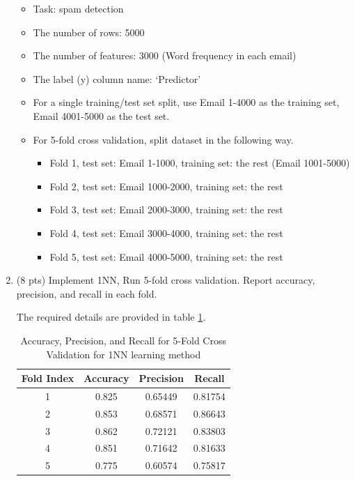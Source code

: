 \documentclass[a4paper]{article}
\theoremstyle{definition}
\newenvironment{soln}{
    \leavevmode\color{blue}\ignorespaces
}{}
\begin{document}
\begin{enumerate}
	\begin{itemize}
		\item Task: spam detection
		\item The number of rows: 5000
		\item The number of features: 3000 (Word frequency in each email)
		\item The label (y) column name: `Predictor'
		\item For a single training/test set split, use Email 1-4000 as the training set, Email 4001-5000 as the test set.
		\item For 5-fold cross validation, split dataset in the following way.
		\begin{itemize}
			\item Fold 1, test set: Email 1-1000, training set: the rest (Email 1001-5000)
			\item Fold 2, test set: Email 1000-2000, training set: the rest
			\item Fold 3, test set: Email 2000-3000, training set: the rest
			\item Fold 4, test set: Email 3000-4000, training set: the rest
			\item Fold 5, test set: Email 4000-5000, training set: the rest			
		\end{itemize}
	\end{itemize}
	
	\item (8 pts) Implement 1NN, Run 5-fold cross validation. Report accuracy, precision, and recall in each fold.
	
	\begin{soln}
    The required details are provided in table \ref{tab:1}.
    \begin{table}[H]
        \centering
        \begin{tabular}{|c|c|c|c|}
            \hline
            Fold Index & Accuracy & Precision & Recall \\
            \hline
            1 & 0.825 & 0.65449 & 0.81754 \\
            \hline
            2 & 0.853 & 0.68571 & 0.86643 \\
            \hline
            3 & 0.862 & 0.72121 & 0.83803 \\
            \hline
            4 & 0.851 & 0.71642 & 0.81633 \\
            \hline
            5 & 0.775 & 0.60574 & 0.75817 \\ 
            \hline
        \end{tabular}
        \caption{Accuracy, Precision, and Recall for 5-Fold Cross Validation for 1NN learning method}
        \label{tab:1}
    \end{table}
    \end{soln}
	

\end{enumerate}
\end{document}
